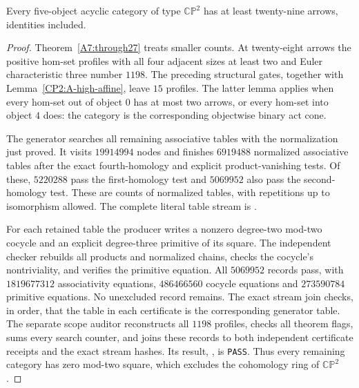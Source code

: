 \begin{theorem}
\label{A7:through28}
Every five-object acyclic category of type $\mathbb{CP}^2$ has
at least twenty-nine arrows, identities included.
\end{theorem}
\begin{proof}
Theorem~\ref{A7:through27} treats smaller counts. At twenty-eight
arrows the positive hom-set profiles with all four adjacent sizes
at least two and Euler characteristic three number $1198$.
The preceding structural gates, together with
Lemma~\ref{CP2:A-high-affine}, leave $15$ profiles.
The latter lemma applies when every hom-set out of object $0$
has at most two arrows, or every hom-set into object $4$ does:
the category is the corresponding objectwise binary act cone.

The generator  searches
all remaining associative tables with the normalization just proved.
It visits $19914994$ nodes and finishes $6919488$ normalized
associative tables after the exact fourth-homology and explicit
product-vanishing tests. Of these, $5220288$ pass the first-homology
test and $5069952$ also pass the second-homology test. These are
counts of normalized tables, with repetitions up to isomorphism
allowed. The complete literal table stream is
.

For each retained table the producer writes a nonzero degree-two
mod-two cocycle and an explicit degree-three primitive of its square.
The independent checker rebuilds all products and normalized chains,
checks the cocycle's nontriviality, and verifies the primitive equation.
All $5069952$ records pass, with $1819677312$ associativity equations,
$486466560$ cocycle equations and $273590784$ primitive equations.
No unexcluded record remains. The exact stream join checks, in order,
that the table in each certificate is the corresponding generator table.
The separate scope auditor reconstructs all $1198$ profiles, checks
all theorem flags, sums every search counter, and joins these records
to both independent certificate receipts and the exact stream hashes.
Its result, , is
\texttt{PASS}. Thus every remaining category has zero mod-two square,
which excludes the cohomology ring of $\mathbb{CP}^2$.
\end{proof}

